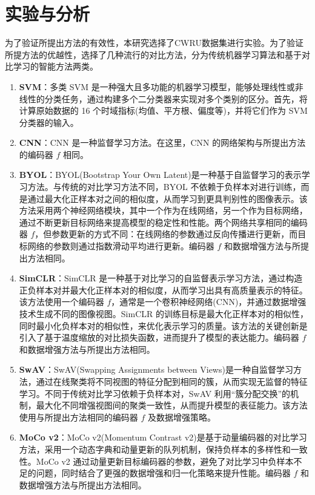 \documentclass[master]{thesis-uestc}
\begin{document}
\section{实验与分析}
为了验证所提出方法的有效性，本研究选择了CWRU数据集进行实验。为了验证所提方法的优越性，选择了几种流行的对比方法，分为传统机器学习算法和基于对比学习的智能方法两类。
\begin{enumerate}[label={(\arabic*)}]
    \item \textbf{SVM}：多类 SVM 是一种强大且多功能的机器学习模型，能够处理线性或非线性的分类任务，通过构建多个二分类器来实现对多个类别的区分。首先，将计算原始数据的 16 个时域指标(均值、平方根、偏度等)，并将它们作为 SVM 分类器的输入。

    \item \textbf{CNN}：CNN 是一种监督学习方法。在这里，CNN 的网络架构与所提出方法的编码器 \(f\) 相同。

    \item \textbf{BYOL}：BYOL(Bootstrap Your Own Latent)是一种基于自监督学习的表示学习方法。与传统的对比学习方法不同，BYOL 不依赖于负样本对进行训练，而是通过最大化正样本对之间的相似度，从而学习到更具判别性的图像表示。该方法采用两个神经网络模块，其中一个作为在线网络，另一个作为目标网络，通过不断更新目标网络来提高模型的稳定性和性能。两个网络共享相同的编码器 \(f\)，但参数更新的方式不同：在线网络的参数通过反向传播进行更新，而目标网络的参数则通过指数滑动平均进行更新。编码器 \(f\) 和数据增强方法与所提出方法相同。

    \item \textbf{SimCLR}：SimCLR 是一种基于对比学习的自监督表示学习方法，通过构造正负样本对并最大化正样本对的相似度，从而学习出具有高质量表示的特征。该方法使用一个编码器 \(f\)，通常是一个卷积神经网络(CNN)，并通过数据增强技术生成不同的图像视图。SimCLR 的训练目标是最大化正样本对的相似性，同时最小化负样本对的相似性，来优化表示学习的质量。该方法的关键创新是引入了基于温度缩放的对比损失函数，进而提升了模型的表达能力。编码器 \(f\) 和数据增强方法与所提出方法相同。

    \item \textbf{SwAV}：SwAV(Swapping Assignments between Views)是一种自监督学习方法，通过在线聚类将不同视图的特征分配到相同的簇，从而实现无监督的特征学习。不同于传统对比学习依赖于负样本对，SwAV 利用“簇分配交换”的机制，最大化不同增强视图间的聚类一致性，从而提升模型的表征能力。该方法使用与所提出方法相同的编码器 \(f\) 及数据增强策略。

    \item \textbf{MoCo v2}：MoCo v2(Momentum Contrast v2)是基于动量编码器的对比学习方法，采用一个动态字典和动量更新的队列机制，保持负样本的多样性和一致性。MoCo v2 通过动量更新目标编码器的参数，避免了对比学习中负样本不足的问题，同时结合了更强的数据增强和归一化策略来提升性能。编码器 \(f\) 和数据增强方法与所提出方法相同。

\end{enumerate}
\end{document}

